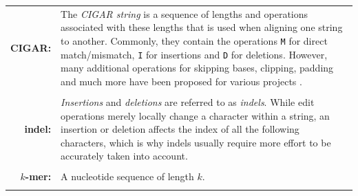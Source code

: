 \documentclass[a4paper,12pt,twoside,BCOR=10mm]{scrbook}
\begin{document}
\begin{tabular}{r p{12cm}}
\textbf{CIGAR: } & 
The \textit{CIGAR string} is a sequence of lengths and operations 
associated with these lengths that is used when aligning one string to another. 
Commonly, they contain the operations \texttt{M} for direct match/mismatch, 
\texttt{I} for insertions and \texttt{D} for deletions. 
However, many additional operations for skipping bases, 
clipping, padding and much more have been proposed 
for various projects \citep{specGFA1,SAM2009,specSAM}.
\\ \\

\textbf{indel: } & 
\textit{Insertions} and \textit{deletions} are referred to as \textit{indels}. While 
edit operations merely locally change a character within a string, an insertion or 
deletion affects the index of all the following characters, which is why indels 
usually require more effort to be accurately taken into account.
\\ \\

$k$\textbf{-mer:} &
A nucleotide sequence of length $ k $.
\\ \\

\end{tabular}
\end{document}
